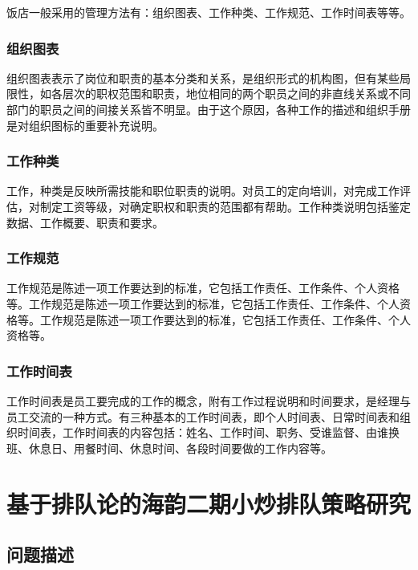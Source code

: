 \documentclass[a4paper,12pt]{book} %
\begin{document}
饭店一般采用的管理方法有：组织图表、工作种类、工作规范、工作时间表等等。

\subsection{组织图表}
组织图表表示了岗位和职责的基本分类和关系，是组织形式的机构图，但有某些局限性，如各层次的职权范围和职责，地位相同的两个职员之间的非直线关系或不同部门的职员之间的间接关系皆不明显。由于这个原因，各种工作的描述和组织手册是对组织图标的重要补充说明。

\subsection{工作种类}
工作，种类是反映所需技能和职位职责的说明。对员工的定向培训，对完成工作评估，对制定工资等级，对确定职权和职责的范围都有帮助。工作种类说明包括鉴定数据、工作概要、职责和要求。

\subsection{工作规范}
工作规范是陈述一项工作要达到的标准，它包括工作责任、工作条件、个人资格等。工作规范是陈述一项工作要达到的标准，它包括工作责任、工作条件、个人资格等。工作规范是陈述一项工作要达到的标准，它包括工作责任、工作条件、个人资格等。

\subsection{工作时间表}
工作时间表是员工要完成的工作的概念，附有工作过程说明和时间要求，是经理与员工交流的一种方式。有三种基本的工作时间表，即个人时间表、日常时间表和组织时间表，工作时间表的内容包括：姓名、工作时间、职务、受谁监督、由谁换班、休息日、用餐时间、休息时间、各段时间要做的工作内容等。

\clearpage{\pagestyle{empty}\cleardoublepage}


\chapter{基于排队论的海韵二期小炒排队策略研究}

\section{问题描述}
\end{document}
